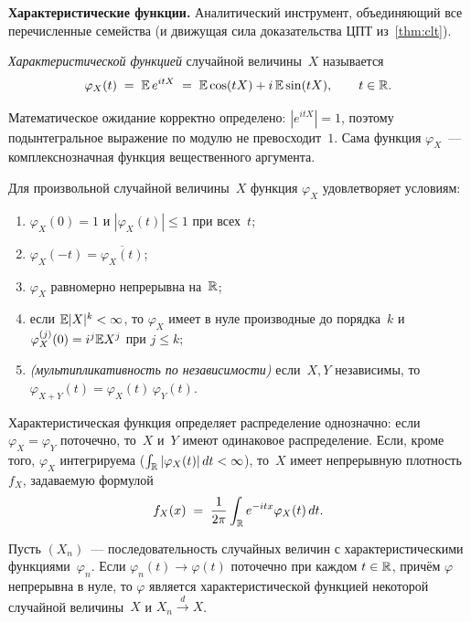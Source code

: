 \medskip
\noindent\textbf{Характеристические функции.} Аналитический инструмент, объединяющий все перечисленные семейства (и движущая сила доказательства ЦПТ из~\cref{thm:clt}).

\begin{definition}
\label{def:char-function}
\emph{Характеристической функцией} случайной величины~$X$ называется
\[
  \varphi_X(t) \;=\; \mathbb{E}\, e^{itX} \;=\; \mathbb{E} \cos(tX) + i\, \mathbb{E} \sin(tX), \qquad t \in \mathbb{R}.
\]
\end{definition}

Математическое ожидание корректно определено: $|e^{itX}| = 1$, поэтому подынтегральное выражение по модулю не превосходит~$1$. Сама функция $\varphi_X$~--- комплекснозначная функция вещественного аргумента.

\begin{proposition}
\label{prop:char-properties}
Для произвольной случайной величины~$X$ функция $\varphi_X$ удовлетворяет условиям:
\begin{enumerate}[label=(\alph*)]
  \item $\varphi_X(0) = 1$ и $|\varphi_X(t)| \leq 1$ при всех~$t$;
  \item $\varphi_X(-t) = \overline{\varphi_X(t)}$;
  \item $\varphi_X$ равномерно непрерывна на~$\mathbb{R}$;
  \item если $\mathbb{E} |X|^k < \infty$, то $\varphi_X$ имеет в нуле производные до порядка~$k$ и $\varphi_X^{(j)}(0) = i^j \mathbb{E} X^j$ при $j \leq k$;
  \item \emph{(мультипликативность по независимости)} если~$X, Y$ независимы, то $\varphi_{X + Y}(t) = \varphi_X(t)\, \varphi_Y(t)$.
\end{enumerate}
\end{proposition}

\begin{theorem}
\label{thm:char-uniqueness}
Характеристическая функция определяет распределение однозначно: если $\varphi_X = \varphi_Y$ поточечно, то~$X$ и~$Y$ имеют одинаковое распределение. Если, кроме того, $\varphi_X$ интегрируема ($\int_{\mathbb{R}} |\varphi_X(t)|\, dt < \infty$), то~$X$ имеет непрерывную плотность~$f_X$, задаваемую формулой
\[
  f_X(x) \;=\; \frac{1}{2\pi} \int_{\mathbb{R}} e^{-itx} \varphi_X(t)\, dt.
\]
\end{theorem}

\begin{theorem}
\label{thm:levy-continuity}
Пусть $(X_n)$~--- последовательность случайных величин с характеристическими функциями~$\varphi_n$. Если $\varphi_n(t) \to \varphi(t)$ поточечно при каждом $t \in \mathbb{R}$, причём $\varphi$ непрерывна в нуле, то $\varphi$ является характеристической функцией некоторой случайной величины~$X$ и $X_n \xrightarrow{d} X$.
\end{theorem}

